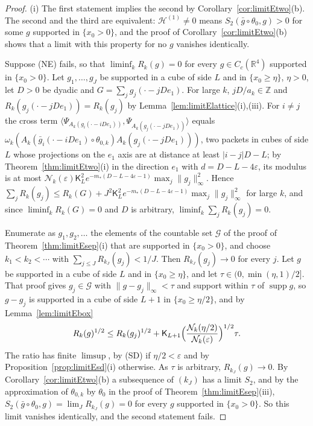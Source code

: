 \documentclass[aps,prd,twocolumn,superscriptaddress,nofootinbib,longbibliography,floatfix,amsmath,amssymb,10pt]{revtex4-2}
\theoremstyle{definition}
\theoremstyle{remark}
\newcommand{\R}{\mathbb{R}}
\newcommand{\Z}{\mathbb{Z}}
\newcommand{\ip}[2]{\langle #1,#2\rangle}
\begin{document}
\begin{proof}
(i) The first statement implies the second by
Corollary~\ref{cor:limitEtwo}(b). The second and the third are equivalent:
$\mathcal H^{(1)}\ne0$ means $S_2(\bar g\circ\theta_0,g)>0$ for some $g$
supported in $\{x_0>0\}$, and the proof of Corollary~\ref{cor:limitEtwo}(b)
shows that a limit with this property for no $g$ vanishes identically.

Suppose (NE) fails, so that $\liminf_kR_k(g)=0$ for every $g\in C_c(\R^4)$
supported in $\{x_0>0\}$. Let $g_1,\dots,g_J$ be supported in a cube of side
$L$ and in $\{x_0\ge\eta\}$, $\eta>0$, let $D>0$ be dyadic and
$G=\sum_jg_j(\cdot-jDe_1)$. For large $k$, $jD/a_k\in\Z$ and
$R_k(g_j(\cdot-jDe_1))=R_k(g_j)$ by Lemma~\ref{lem:limitElattice}(i),(iii).
For $i\ne j$ the cross term $\ip{\Psi_{A_k(g_i(\cdot-iDe_1))}}
{\Psi_{A_k(g_j(\cdot-jDe_1))}}$ equals $\omega_k(A_k(\bar g_i(\cdot-iDe_1)
\circ\theta_{0,k})A_k(g_j(\cdot-jDe_1)))$, two packets in cubes of side $L$
whose projections on the $e_1$ axis are at distance at least $|i-j|D-L$; by
Theorem~\ref{thm:limitEtwo}(i) in the direction $e_1$ with $d=D-L-4
\varepsilon$, its modulus is at most $\mathcal N_k(\varepsilon)\mathsf
K_L^2e^{-m_*(D-L-4\varepsilon-1)}\max_j\|g_j\|_\infty^2$. Hence
$\sum_jR_k(g_j)\le R_k(G)+J^2\mathsf K_L^2e^{-m_*(D-L-4\varepsilon-1)}
\max_j\|g_j\|_\infty^2$ for large $k$, and since $\liminf_kR_k(G)=0$ and $D$
is arbitrary, $\liminf_k\sum_jR_k(g_j)=0$.

Enumerate as $g_1,g_2,\dots$ the elements of the countable set $\mathcal G$
of the proof of Theorem~\ref{thm:limitEsep}(i) that are supported in
$\{x_0>0\}$, and choose $k_1<k_2<\cdots$ with $\sum_{j\le J}R_{k_J}(g_j)<
1/J$. Then $R_{k_J}(g_j)\to0$ for every $j$. Let $g$ be supported in a cube
of side $L$ and in $\{x_0\ge\eta\}$, and let $\tau\in(0,\min(\eta,1)/2]$. That proof
gives $g_j\in\mathcal G$ with $\|g-g_j\|_\infty<\tau$ and support within
$\tau$ of $\operatorname{supp}g$, so $g-g_j$ is supported in a cube of side
$L+1$ in $\{x_0\ge\eta/2\}$, and by Lemma~\ref{lem:limitEbox}
\[
R_k(g)^{1/2}\le R_k(g_j)^{1/2}+\mathsf K_{L+1}\Bigl(\frac{\mathcal N_k(
\eta/2)}{\mathcal N_k(\varepsilon)}\Bigr)^{1/2}\tau .
\]
The ratio has finite $\limsup$, by (SD) if $\eta/2<\varepsilon$ and by
Proposition~\ref{prop:limitEsd}(i) otherwise. As $\tau$ is arbitrary,
$R_{k_J}(g)\to0$. By Corollary~\ref{cor:limitEtwo}(b) a subsequence of
$(k_J)$ has a limit $S_2$, and by the approximation of $\theta_{0,k}$ by
$\theta_0$ in the proof of Theorem~\ref{thm:limitEsep}(iii), $S_2(\bar g
\circ\theta_0,g)=\lim_JR_{k_J}(g)=0$ for every $g$ supported in
$\{x_0>0\}$. So this limit vanishes identically, and the second statement
fails.


\end{proof}
\end{document}
